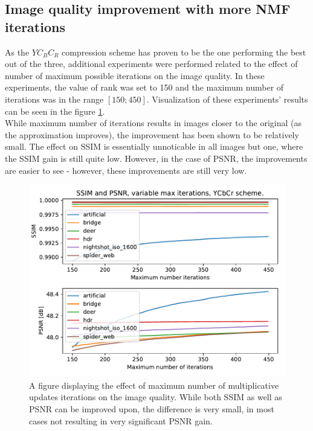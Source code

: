 \documentclass[thesis=M,english]{FITthesis}[2012/10/20]
\begin{document}
\subsection{Image quality improvement with more NMF iterations}
As the $YC_BC_R$ compression scheme has proven to be the one performing the best
out of the three, additional experiments were performed related to the effect
of number of maximum possible iterations on the image quality. In these experiments,
the value of rank was set to 150 and the maximum number of iterations was in the range
$[150;450]$. Visualization of these experiments' results can be seen in the figure \ref{fig:maxiter_ycbcr}.
\\

While maximum number of iterations results in images closer to the original (as the
approximation improves), the improvement has been shown to be relatively small. The effect
on SSIM is essentially unnoticable in all images but one, where the SSIM gain is still
quite low. However, in the case of PSNR, the improvements are easier to see - however, these
improvements are still very low.
\\

\begin{figure}
  \centering
  \includegraphics[scale=0.8]{imgs/results/psnr_ssim_maxiter_ycbcr}
  \caption{A figure displaying the effect of maximum number of multiplicative updates
           iterations on the image quality. While both SSIM as well as PSNR can be
           improved upon, the difference is very small, in most cases not resulting in
           very significant PSNR gain.}
  \label{fig:maxiter_ycbcr}
\end{figure}
\end{document}
